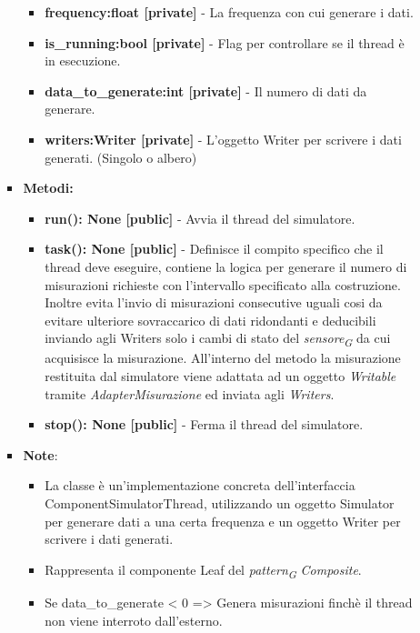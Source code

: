 \begin{itemize}
\begin{itemize}
\begin{itemize}
\begin{itemize}
        \item \textbf{frequency:float [private]} - La frequenza con cui generare i dati.
        \item \textbf{is\_running:bool [private]} - Flag per controllare se il thread è in esecuzione.
        \item \textbf{data\_to\_generate:int [private]} - Il numero di dati da generare.
        \item \textbf{writers:Writer [private]} - L'oggetto Writer per scrivere i dati generati. (Singolo o albero)
        \end{itemize}
    \item \textbf{Metodi: }
        \begin{itemize}
        \item \textbf{run(): None [public]} - Avvia il thread del simulatore.
        \item \textbf{task(): None [public]} - Definisce il compito specifico che il thread deve eseguire, contiene la logica per generare il numero di misurazioni richieste con l'intervallo specificato alla costruzione.
        Inoltre evita l'invio di misurazioni consecutive uguali cosi da evitare ulteriore sovraccarico di dati ridondanti e deducibili inviando agli Writers solo i cambi di stato del \textit{sensore}\textsubscript{\textit{G}} da cui acquisisce la misurazione.
        All'interno del metodo la misurazione restituita dal simulatore viene adattata ad un oggetto \textit{Writable} tramite \textit{AdapterMisurazione} ed inviata agli \textit{Writers}.
        \item \textbf{stop(): None [public]} - Ferma il thread del simulatore.
        \end{itemize}
    \item\textbf{Note}:
        \begin{itemize}
            \item La classe è un'implementazione concreta dell'interfaccia ComponentSimulatorThread, utilizzando un oggetto Simulator per generare dati a una certa frequenza e un oggetto Writer per scrivere i dati generati.
            \item Rappresenta il componente Leaf del \textit{pattern}\textsubscript{\textit{G}} \textit{Composite}.
            \item Se data\_to\_generate < 0 => Genera misurazioni finchè il thread non viene interroto dall'esterno.

\end{itemize}
\end{itemize}
\end{itemize}
\end{itemize}
